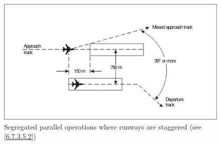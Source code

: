 \documentclass[../main.tex]{subfiles}
\begin{document}
    \vfill
    \begin{figure}[!ht]
        \centering
        \includegraphics[width=14cm]{Images/Fig 6-3.png}
        \caption[Segregated parallel operations where runways are staggered]{Segregated parallel operations where runways are staggered (see \ref{6.7.3.5.2})}
        \label{fig:6-3}
    \end{figure}

    \newpage
\end{document}

